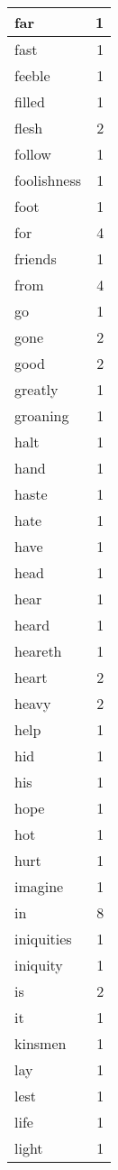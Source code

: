 \begin{center}
\begin{longtable}{l|r}
far & 1\\ \hline 
fast & 1\\ \hline 
feeble & 1\\ \hline 
filled & 1\\ \hline 
flesh & 2\\ \hline 
follow & 1\\ \hline 
foolishness & 1\\ \hline 
foot & 1\\ \hline 
for & 4\\ \hline 
friends & 1\\ \hline 
from & 4\\ \hline 
go & 1\\ \hline 
gone & 2\\ \hline 
good & 2\\ \hline 
greatly & 1\\ \hline 
groaning & 1\\ \hline 
halt & 1\\ \hline 
hand & 1\\ \hline 
haste & 1\\ \hline 
hate & 1\\ \hline 
have & 1\\ \hline 
head & 1\\ \hline 
hear & 1\\ \hline 
heard & 1\\ \hline 
heareth & 1\\ \hline 
heart & 2\\ \hline 
heavy & 2\\ \hline 
help & 1\\ \hline 
hid & 1\\ \hline 
his & 1\\ \hline 
hope & 1\\ \hline 
hot & 1\\ \hline 
hurt & 1\\ \hline 
imagine & 1\\ \hline 
in & 8\\ \hline 
iniquities & 1\\ \hline 
iniquity & 1\\ \hline 
is & 2\\ \hline 
it & 1\\ \hline 
kinsmen & 1\\ \hline 
lay & 1\\ \hline 
lest & 1\\ \hline 
life & 1\\ \hline 
light & 1\\ \hline 

\end{longtable}
\end{center}
